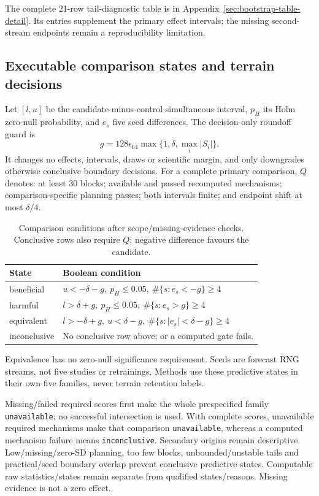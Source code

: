 \documentclass[11pt]{article}
\begin{document}
The complete 21-row tail-diagnostic table is in Appendix~\ref{sec:bootstrap-table-detail}.
Its entries supplement the primary effect intervals; the missing second-stream
endpoints remain a reproducibility limitation.

\subsection{Executable comparison states and terrain decisions}
\label{sec:decision-conditions}
Let \([l,u]\) be the candidate-minus-control simultaneous interval,
\(p_H\) its Holm zero-null probability, and \(e_s\) five seed differences.
The decision-only roundoff guard is
\begin{equation}
 g=128\epsilon_{64}\max\{1,\delta,\max_i|S_i|\}.
 \label{eq:decision-roundoff}
\end{equation}
It changes no effects, intervals, draws or scientific margin, and only
downgrades otherwise conclusive boundary decisions. For a complete primary
comparison, \(Q\) denotes: at least 30 blocks; available and passed recomputed
mechanisms; comparison-specific planning passes; both intervals finite;
and endpoint shift at most \(\delta/4\).

\begin{table}[htbp]
\centering\small
\caption{Comparison conditions after scope/missing-evidence checks.
Conclusive rows also require \(Q\); negative difference favours the candidate.}
\label{tab:comparison-conditions}
\begin{tabular}{lp{4.8in}}
\toprule
State & Boolean condition\\
\midrule
beneficial & \(u<-\delta-g,\ p_H\leq0.05,\ \#\{s:e_s<-g\}\geq4\)\\
harmful & \(l>\delta+g,\ p_H\leq0.05,\ \#\{s:e_s>g\}\geq4\)\\
equivalent & \(l>-\delta+g,\ u<\delta-g,\ \#\{s:|e_s|<\delta-g\}\geq4\)\\
inconclusive & No conclusive row above; or a computed gate fails.\\
\bottomrule
\end{tabular}
\end{table}

Equivalence has no zero-null significance requirement. Seeds are forecast
RNG streams, not five studies or retrainings. Methods use these predictive
states in their own five families, never terrain retention labels.

Missing/failed required scores first make the whole prespecified family
\texttt{unavailable}; no successful intersection is used. With complete
scores, unavailable required mechanisms make that comparison
\texttt{unavailable}, whereas a computed mechanism failure means
\texttt{inconclusive}. Secondary origins remain descriptive.
Low/missing/zero-SD planning, too few blocks, unbounded/unstable tails
and practical/seed boundary overlap prevent conclusive predictive states.
Computable raw statistics/states remain separate from qualified states/reasons.
Missing evidence is not a zero effect.
\end{document}
